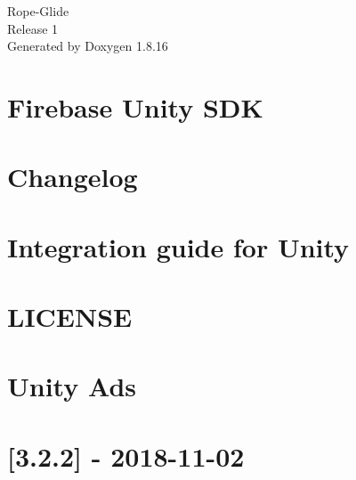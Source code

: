 \let\mypdfximage\pdfximage\def\pdfximage{\immediate\mypdfximage}\documentclass[twoside]{book}
\newcommand{\+}{\discretionary{\mbox{\scriptsize$\hookleftarrow$}}{}{}}
\newcommand{\clearemptydoublepage}{%
  \newpage{\pagestyle{empty}\cleardoublepage}%
}
\begin{document}
\hypersetup{pageanchor=false,
             bookmarksnumbered=true,
             pdfencoding=unicode
            }
\begin{titlepage}
\vspace*{7cm}
\begin{center}%
{\Large Rope-\/\+Glide \\[1ex]\large Release 1 }\\
\vspace*{1cm}
{\large Generated by Doxygen 1.8.16}\\
\end{center}
\end{titlepage}
\clearemptydoublepage
{}
\tableofcontents
\clearemptydoublepage
{}
\hypersetup{pageanchor=true}

\chapter{Firebase Unity S\+DK}
\label{md_Assets_Firebase_Editor_readme}

\chapter{Changelog}
\label{autotoc_md56}

\chapter{Integration guide for Unity}
\label{autotoc_md65}

\chapter{L\+I\+C\+E\+N\+SE}
\label{md_Library_PackageCache_com_8unity_8ads_0d2_83_81_LICENSE}

\chapter{Unity Ads}
\label{autotoc_md66}

\chapter{\mbox{[}3.2.2\mbox{]} -\/ 2018-\/11-\/02}
\label{autotoc_md67}

\end{document}
